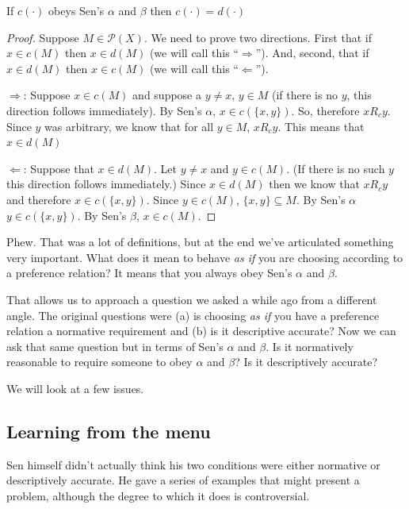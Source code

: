 \begin{proposition}
\label{p:sensalpha}
If $c(\cdot)$ obeys Sen's $\alpha$ and $\beta$ then $c(\cdot) = d(\cdot)$
\end{proposition}
\begin{proof}
Suppose $M \in \mathscr{P}(X)$.  We need to prove two directions.  First that if $x \in c(M)$ then $x \in d(M)$ (we will call this ``$\Rightarrow$''). And, second, that if $x \in d(M)$ then $x \in c(M)$ (we will call this ``$\Leftarrow$'').
    
$\Rightarrow$: Suppose $x \in c(M)$ and suppose a $y \ne x$, $y \in M$ (if there is no $y$, this direction follows immediately). By Sen's $\alpha$, $x \in c(\{x, y\})$. So, therefore $x R_c y$. Since $y$ was arbitrary, we know that for all $y \in M$, $x R_c y$. This means that $x \in d(M)$

   
$\Leftarrow$: Suppose that $x \in d(M)$. Let $y \ne x$ and $y \in c(M)$. (If there is no such $y$ this direction follows immediately.) Since $x \in d(M)$ then we know that $x R_c y$ and therefore $x \in c(\{x,y\})$. Since $y \in c(M)$, $\{x,y\} \subseteq M$. By Sen's $\alpha$ $y \in c(\{x,y\})$. By Sen's $\beta$, $x \in c(M)$.
\end{proof}

Phew.  That was a lot of definitions, but at the end we've articulated something very important.  What does it mean to behave {\it as if} you are choosing according to a preference relation?  It means that you always obey Sen's $\alpha$ and $\beta$.

That allows us to approach a question we asked a while ago from a different angle.  The original questions were (a) is choosing {\it as if} you have a preference relation a normative requirement and (b) is it descriptive accurate?  Now we can ask that same question but in terms of Sen's $\alpha$ and $\beta$.  Is it normatively reasonable to require someone to obey $\alpha$ and $\beta$?  Is it descriptively accurate?

We will look at a few issues.

\subsection{Learning from the menu}

Sen himself didn't actually think his two conditions were either normative or descriptively accurate. He gave a series of examples that might present a problem, although the degree to which it does is controversial.

